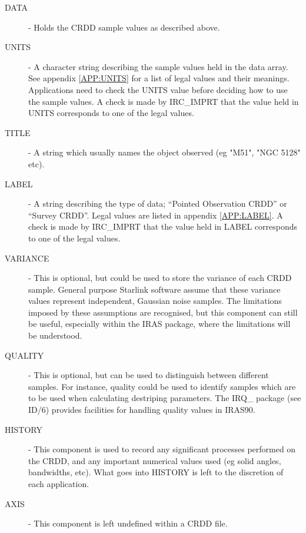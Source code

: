 \begin{description}

\item [DATA] - Holds the CRDD sample values as described above.

\item [UNITS] - A character string describing the sample values held in the data
array. See appendix \ref {APP:UNITS} for a list of legal values and their
meanings. Applications need to check the UNITS value before deciding how to use
the sample values. A check is made by IRC\_IMPRT that the value held in UNITS 
corresponds to one of the legal values.

\item [TITLE] - A string which usually names the object observed (eg "M51", 
"NGC 5128" etc).

\item [LABEL] - A string describing the type of data; ``Pointed Observation
CRDD'' or ``Survey CRDD''. Legal values are listed in appendix \ref{APP:LABEL}.
A check is made by IRC\_IMPRT that the value held in LABEL corresponds to one of
the legal values. 

\item [VARIANCE] - This is optional, but could be used to store the variance of
each CRDD sample. General purpose Starlink software assume that these variance 
values represent independent, Gaussian noise samples. The limitations imposed 
by these assumptions are recognised, but this component can still be useful, 
especially within the IRAS package, where the limitations will be understood.

\item [QUALITY] - This is optional, but can be used to distinguish between 
different samples. For instance, quality could be used to identify samples
which are to be used when calculating destriping parameters. The IRQ\_ package 
(see ID/6) provides facilities for handling quality values in IRAS90.

\item [HISTORY] - This component is used to record any significant processes 
performed on the CRDD, and any important numerical values used (eg solid angles, 
bandwidths, etc). What goes into HISTORY is left to the discretion of each 
application.

\item [AXIS] - This component is left undefined within a CRDD file.

\end{description}

